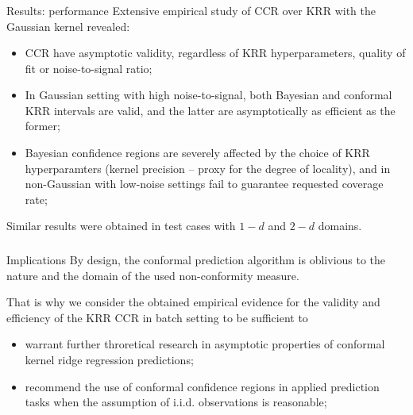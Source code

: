\documentclass[t]{beamer}  %
\begin{document}
\begin{frame}[c]\frametitle{\insertsection}
  \begin{block}{Results: performance}
    Extensive empirical study of CCR over KRR with the Gaussian kernel revealed:
    \begin{itemize}
      \item CCR have asymptotic validity, regardless of KRR hyperparameters, quality
      of fit or noise-to-signal ratio;
      \item In Gaussian setting with high noise-to-signal, both Bayesian and conformal
      KRR intervals are valid, and the latter are asymptotically as efficient as the
      former;
      \item Bayesian confidence regions are severely affected by the choice of KRR
      hyperparamters (kernel precision -- proxy for the degree of locality), and
      in non-Gaussian with low-noise settings fail to guarantee requested coverage
      rate;
    \end{itemize}
    Similar results were obtained in test cases with $1-d$ and $2-d$ domains.
  \end{block}
\end{frame}

\begin{frame}[c]\frametitle{\insertsection}
  \begin{block}{Implications}
    By design, the conformal prediction algorithm is oblivious to the nature and
    the domain of the used non-conformity measure.

    That is why we consider the obtained empirical evidence for the validity and
    efficiency of the KRR CCR in batch setting to be sufficient to \begin{itemize}
      \item warrant further throretical research in asymptotic properties of conformal
      kernel ridge regression predictions;
      \item recommend the use of conformal confidence regions in applied prediction
      tasks when the assumption of i.i.d. observations is reasonable;
    \end{itemize}
  \end{block}
\end{frame}
\end{document}
